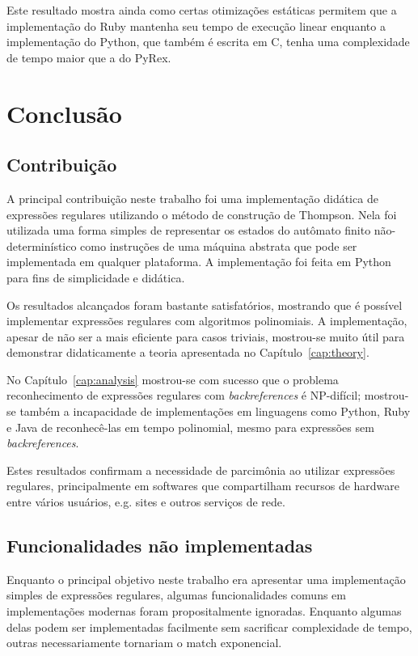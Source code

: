 \documentclass[a4paper,12pt,oneside,onecolumn]{uerj}
\begin{document}
Este resultado mostra ainda como certas otimizações estáticas permitem que a implementação do Ruby mantenha seu tempo de execução linear enquanto a implementação do Python, que também é escrita em C, tenha uma complexidade de tempo maior que a do PyRex.

\chapter{Conclusão}

\section{Contribuição}

A principal contribuição neste trabalho foi uma implementação didática de expressões regulares utilizando o método de construção de Thompson. Nela foi utilizada uma forma simples de representar os estados do autômato finito não-determinístico como instruções de uma máquina abstrata que pode ser implementada em qualquer plataforma. A implementação foi feita em Python para fins de simplicidade e didática.

Os resultados alcançados foram bastante satisfatórios, mostrando que é possível implementar expressões regulares com algoritmos polinomiais. A implementação, apesar de não ser a mais eficiente para casos triviais, mostrou-se muito útil para demonstrar didaticamente a teoria apresentada no Capítulo~\ref{cap:theory}.

No Capítulo~\ref{cap:analysis} mostrou-se com sucesso que o problema reconhecimento de expressões regulares com \emph{backreferences} é NP-difícil; mostrou-se também a incapacidade de implementações em linguagens como Python, Ruby e Java de reconhecê-las em tempo polinomial, mesmo para expressões sem \emph{backreferences}.

Estes resultados confirmam a necessidade de parcimônia ao utilizar expressões regulares, principalmente em softwares que compartilham recursos de hardware entre vários usuários, e.g. sites e outros serviços de rede.

\section{Funcionalidades não implementadas}

Enquanto o principal objetivo neste trabalho era apresentar uma implementação simples de expressões regulares, algumas funcionalidades comuns em implementações modernas foram propositalmente ignoradas. Enquanto algumas delas podem ser implementadas facilmente sem sacrificar complexidade de tempo, outras necessariamente tornariam o match exponencial.
\end{document}

